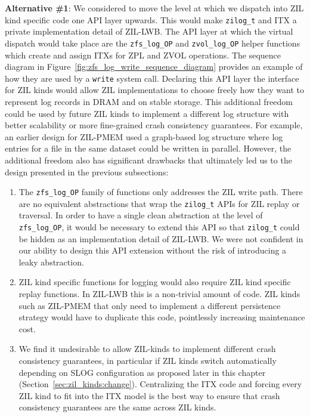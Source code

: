 \documentclass[12pt,a4paper,twoside]{book}
\begin{document}
\textbf{Alternative \#1}: We considered to move the level at which we dispatch into ZIL kind specific code one API layer upwards.
This would make \lstinline{zilog_t} and ITX a private implementation detail of ZIL-LWB.
The API layer at which the virtual dispatch would take place are the \lstinline{zfs_log_OP} and \lstinline{zvol_log_OP} helper functions which create and assign ITXs for ZPL and ZVOL operations.
The sequence diagram in Figure~\ref{fig:zfs_log_write_sequence_diagram} provides an example of how they are used by a \lstinline{write} system call.
Declaring this API layer the interface for ZIL kinds would allow ZIL implementations to choose freely how they want to represent log records in DRAM and on stable storage.
This additional freedom could be used by future ZIL kinds to implement a different log structure with better scalability or more fine-grained crash consistency guarantees.
For example, an earlier design for ZIL-PMEM used a graph-based log structure where log entries for a file in the same dataset could be written in parallel.
However, the additional freedom also has significant drawbacks that ultimately led us to the design presented in the previous subsections:
\begin{enumerate}[noitemsep]
    \item The \lstinline{zfs_log_OP} family of functions only addresses the ZIL write path.
        There are no equivalent abstractions that wrap the \lstinline{zilog_t} APIs for ZIL replay or traversal.
        In order to have a single clean abstraction at the level of \lstinline{zfs_log_OP}, it would be necessary to extend this API so that \lstinline{zilog_t} could be hidden as an implementation detail of ZIL-LWB.
        We were not confident in our ability to design this API extension without the risk of introducing a leaky abstraction.
    \item ZIL kind specific functions for logging would also require ZIL kind specific replay functions.
        In ZIL-LWB this is a non-trivial amount of code.
        ZIL kinds such as ZIL-PMEM that only need to implement a different persistence strategy would have to duplicate this code, pointlessly increasing maintenance cost.
    \item We find it undesirable to allow ZIL-kinds to implement different crash consistency guarantees, in particular if ZIL kinds switch automatically depending on SLOG configuration as proposed later in this chapter (Section~\ref{sec:zil_kinds:change}).
        Centralizing the ITX code and forcing every ZIL kind to fit into the ITX model is the best way to ensure that crash consistency guarantees are the same across ZIL kinds.
\end{enumerate}
\end{document}
